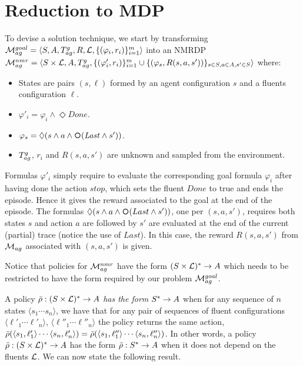 \section{Reduction to MDP}\label{sect:rl-goals-reduction-to-mdp}
To devise a solution technique, we start by transforming
$\mathcal{M}_{ag}^{goal}= \langle S, A, T_{ag}^{g}, R, \mathcal{L},
\{(\varphi_i,r_i)\}_{i=1}^{m} \rangle$ into an NMRDP $\mathcal{M}_{ag}^{nmr} = \langle S\times \mathcal{L}, A, T_{ag}^{g}, \{(\varphi'_i,r_i)\}_{i=1}^{m} \cup \{(\varphi_s, R(s,a, s'))\}_{s\in S, a\in
	A, s'\in S} \rangle$ where:
\begin{itemize}
	\item States are pairs $(s,\ell)$  formed by an agent configuration $s$ and a fluents configuration $\ell$.
	\item $\varphi'_i = \varphi_i \land \Diamond Done$.
	\item $\varphi_s = \Diamond(s\land a\land \Next(\Last \land s'))$.
	\item $T_{ag}^{g}$, $r_i$ and  $R(s,a, s')$ are unknown and sampled from the environment.
\end{itemize} 

Formulas $\varphi'_i$ simply require to evaluate the corresponding
goal formula $\varphi_i$ after having done the action $stop$, which
sets the fluent $Done$ to true and ends the episode. Hence it gives
the reward associated to the goal at the end of the episode.
The formulas $\Diamond(s\land a\land \Next(Last \land s'))$, one per
$(s,a,s')$, requires both states $s$ and action $a$ are followed by
$s'$ are evaluated at the end of the current (partial) trace (notice
the use of $Last$).  In this case, the reward $R(s,a,s')$ from
$\mathcal{M}_{ag}$ associated with $ (s,a,s')$ is given.  


Notice that policies for $\mathcal{M}_{ag}^{nmr}$ have the form
$(S\times\mathcal{L})^*\rightarrow A$ which needs to be restricted to have the form required by our problem
$\mathcal{M}_{ag}^{goal}$.



A policy $\bar{\rho}:(S\times\mathcal{L})^*\rightarrow A$ \emph{has the form} $S^*\rightarrow A$
when for any sequence of $n$ states
$\langle s_1 \cdots s_n\rangle$,
we have that 
for any pair of sequences of fluent configurations 
$\langle \ell'_1 \cdots \ell'_n\rangle$, 
$\langle \ell''_1 \cdots \ell''_n\rangle$
the policy returns the same action, 
$\bar{\rho}(\langle s_1,\ell'_1\rangle \cdots \langle s_n,\ell'_n\rangle) = \bar{\rho}(\langle s_1,\ell''_1\rangle \cdots \langle s_n,\ell''_n\rangle)$.
In other words, a policy  $\bar{\rho}:(S\times\mathcal{L})^*\rightarrow A$ has the form $\bar{\rho}:S^*\rightarrow A$ when it does not depend on the fluents $\mathcal{L}$. 
We can now state the following result.



